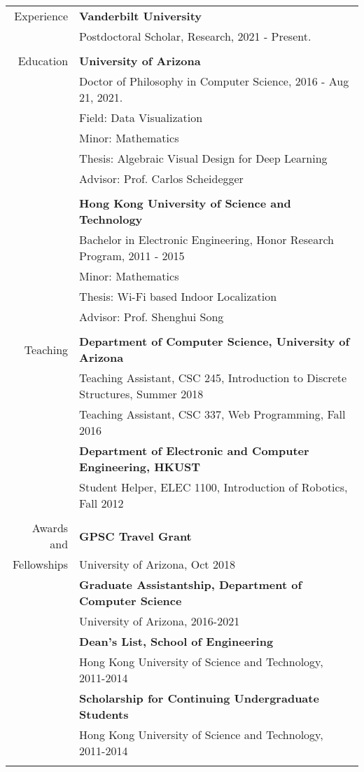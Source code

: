 \documentclass[letterpaper,11pt,oneside]{article}
\begin{document}
\noindent \begin{tabular}{@{} r l}
\Large{Experience}    & \textbf{Vanderbilt University} \\
    & Postdoctoral Scholar, Research, 2021 - Present. \\
    & \\
\Large{Education}    & \textbf{University of Arizona} \\

    & Doctor of Philosophy in Computer Science, 2016 - Aug 21, 2021. \\
    & Field: Data Visualization \\
    & Minor: Mathematics \\
    & Thesis: Algebraic Visual Design for Deep Learning \\
    & Advisor: Prof. Carlos Scheidegger \\
    & \\
    & \textbf{Hong Kong University of Science and Technology} \\
    & Bachelor in Electronic Engineering, Honor Research Program, 2011 - 2015 \\
    & Minor: Mathematics \\
    & Thesis: Wi-Fi based Indoor Localization \\
    & Advisor: Prof. Shenghui Song \\
    & \\

\Large{Teaching}   & \textbf{Department of Computer Science, University of Arizona} \\
    & Teaching Assistant, CSC 245, Introduction to Discrete Structures, Summer 2018 \\
    & Teaching Assistant, CSC 337, Web Programming, Fall 2016 \\
    &\textbf{Department of Electronic and Computer Engineering, HKUST} \\
    & Student Helper, ELEC 1100, Introduction of Robotics, Fall 2012 \\
    & \\

\Large{Awards and}
    & \textbf{GPSC Travel Grant} \\
\Large{Fellowships} 
    & University of Arizona, Oct 2018 \\
    & \textbf{Graduate Assistantship, Department of Computer Science} \\
    & University of Arizona, 2016-2021 \\
    & \textbf{Dean’s List, School of Engineering} \\
    & Hong Kong University of Science and Technology, 2011-2014 \\
    & \textbf{Scholarship for Continuing Undergraduate Students} \\
    & Hong Kong University of Science and Technology, 2011-2014 \\
    & \\


\end{tabular}
\end{document}

